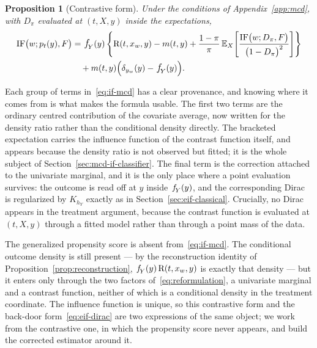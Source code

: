 \documentclass[11pt]{article}
\theoremstyle{plain}
\newtheorem{mypropo}{Proposition}
\theoremstyle{definition}
\theoremstyle{remark}
\newcommand{\pE}{\ensuremath{\mathbb{E}}}
\newcommand{\pf}[1]{\ensuremath{\,\mathlarger{\textit{f}}_{#1}}}
\newcommand{\ratio}{\ensuremath{\pi}}
\newcommand{\contrast}{D_{\ratio}}
\newcommand{\DensityRatio}{\text{R}}
\newcommand{\IF}{\mathrm{IF}}
\begin{document}
\begin{mypropo}[Contrastive form]
\label{prop:if-mcd}
Under the conditions of Appendix~\ref{app:mcd}, with $\contrast$ evaluated at $(t,X,y)$ inside
the expectations,
\begin{equation}
\begin{aligned}
\IF\big(w;p_t(y),F\big)
&= \pf{Y}(y)\left\{
\DensityRatio(t,x_w,y) - m(t,y)
+ \frac{1-\ratio}{\ratio}\,
\pE_X\!\left[ \frac{\IF\big(w;\contrast,F\big)}{\big(1-\contrast\big)^{2}} \right]
\right\} \\
&\quad + m(t,y)\Big( \delta_{y_w}(y) - \pf{Y}(y) \Big).
\end{aligned}
\label{eq:if-mcd}
\end{equation}
\end{mypropo}

Each group of terms in~\eqref{eq:if-mcd} has a clear provenance, and knowing where it comes
from is what makes the formula usable. The first two terms are the ordinary centred
contribution of the covariate average, now written for the density ratio rather than the
conditional density directly. The bracketed expectation carries the influence function of the
contrast function itself, and appears because the density ratio is not observed but fitted; it
is the whole subject of Section~\ref{sec:mcd-if-classifier}. The final term is the correction
attached to the univariate marginal, and it is the only place where a point evaluation
survives: the outcome is read off at $y$ inside $\pf{Y}(y)$, and the corresponding Dirac is
regularized by $K_{h_Y}$ exactly as in Section~\ref{sec:eif-classical}. Crucially, no Dirac
appears in the treatment argument, because the contrast function is evaluated at $(t,X,y)$
through a fitted model rather than through a point mass of the data.

The generalized propensity score is absent from~\eqref{eq:if-mcd}. The conditional outcome
density is still present --- by the reconstruction identity of
Proposition~\ref{prop:reconstruction}, $\pf{Y}(y)\,\DensityRatio(t,x_w,y)$ is exactly that
density --- but it enters only through the two factors of~\eqref{eq:reformulation}, a univariate
marginal and a contrast function, neither of which is a conditional density in the treatment
coordinate. The influence function is unique, so this contrastive form and the back-door
form~\eqref{eq:eif-dirac} are two expressions of the same object; we work from the contrastive
one, in which the propensity score never appears, and build the corrected estimator around it.
\end{document}
